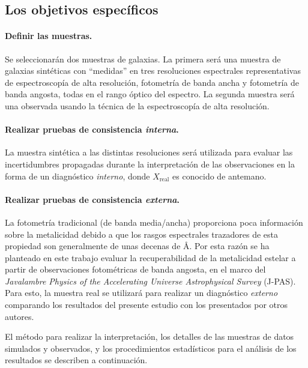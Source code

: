\subsection{Los objetivos específicos}

\paragraph{Definir las muestras.} Se seleccionarán dos muestras de galaxias. La primera será una
muestra de galaxias sintéticas con ``medidas'' en tres resoluciones espectrales representativas de
espectroscopía de alta resolución, fotometría de banda ancha y fotometría de banda angosta, todas en
el rango óptico del  espectro. La segunda muestra será una observada usando la técnica de la
espectroscopía de alta resolución.

\paragraph{Realizar pruebas de consistencia \emph{interna}.} La muestra sintética a las distintas
resoluciones será utilizada para evaluar las incertidumbres propagadas durante la interpretación de
las observaciones en la forma de un diagnóstico \emph{interno}, donde $X_\text{real}$ es conocido de
antemano.

\paragraph{Realizar pruebas de consistencia \emph{externa}.} La fotometría tradicional (de banda
media/ancha) proporciona poca información sobre la metalicidad debido a que los rasgos espectrales
trazadores de esta propiedad son generalmente de unas decenas de \AA. Por esta razón se ha planteado
en este trabajo evaluar la recuperabilidad de la metalicidad estelar a partir de observaciones
fotométricas de banda angosta, en el marco del \emph{Javalambre Physics of the Accelerating Universe
Astrophysical Survey} (J-PAS). Para esto, la muestra real se utilizará para realizar un diagnóstico
\emph{externo} comparando los resultados del presente estudio con los presentados por otros autores.

El método para realizar la interpretación, los detalles de las muestras de datos simulados y
observados, y los procedimientos estadísticos para el análisis de los resultados se describen a
continuación.
